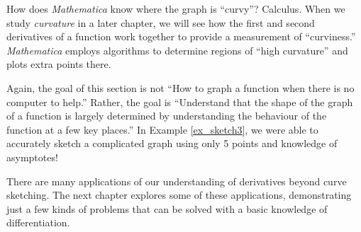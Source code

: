 How does \textit{Mathematica} know where the graph is ``curvy''? Calculus. When we study \textit{curvature} in a later chapter, we will see how the first and second derivatives of a function work together to provide a measurement of ``curviness.'' \textit{Mathematica} employs algorithms to determine regions of ``high curvature'' and plots extra points there.

Again, the goal of this section is not ``How to graph a function when there is no computer to help.'' Rather, the goal is ``Understand that the shape of the graph of a function is largely determined by understanding the behaviour of the function at a few key places.'' In Example \ref{ex_sketch3}, we were able to accurately sketch a complicated graph using only 5 points and knowledge of asymptotes!
\enlargethispage{\baselineskip}

There are many applications of our understanding of derivatives beyond curve sketching. The next chapter explores some of these applications, demonstrating just a few kinds of problems that can be solved with a basic knowledge of differentiation. 

